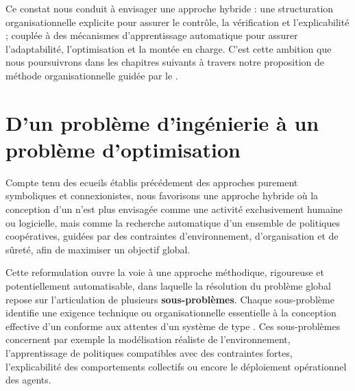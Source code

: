 Ce constat nous conduit à envisager une approche hybride : une structuration organisationnelle explicite pour assurer le contrôle, la vérification et l'explicabilité ; couplée à des mécanismes d'apprentissage automatique pour assurer l'adaptabilité, l'optimisation et la montée en charge. C'est cette ambition que nous poursuivrons dans les chapitres suivants à travers notre proposition de méthode organisationnelle guidée par le .



\chapter{D'un problème d'ingénierie à un problème d'optimisation}\label{chap:hypotheses}


Compte tenu des ecueils établis précédement des approches purement symboliques et connexionistes, nous favorisons une approche hybride où la conception d'un  n'est plus envisagée comme une activité exclusivement humaine ou logicielle, mais comme la recherche automatique d'un ensemble de politiques coopératives, guidées par des contraintes d'environnement, d'organisation et de sûreté, afin de maximiser un objectif global.

Cette reformulation ouvre la voie à une approche méthodique, rigoureuse et potentiellement automatisable, dans laquelle la résolution du problème global repose sur l'articulation de plusieurs \textbf{sous-problèmes}. Chaque sous-problème identifie une exigence technique ou organisationnelle essentielle à la conception effective d'un  conforme aux attentes d'un système de type . Ces sous-problèmes concernent par exemple la modélisation réaliste de l'environnement, l'apprentissage de politiques compatibles avec des contraintes fortes, l'explicabilité des comportements collectifs ou encore le déploiement opérationnel des agents.

